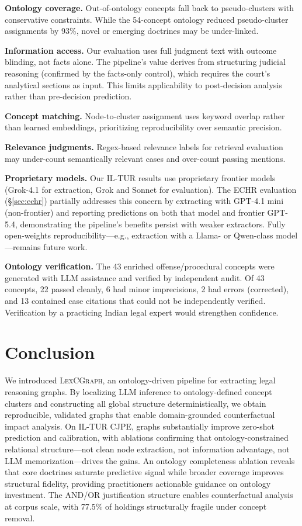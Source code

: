 \documentclass[11pt]{article}
\begin{document}
\textbf{Ontology coverage.} Out-of-ontology concepts fall back to pseudo-clusters with conservative constraints. While the 54-concept ontology reduced pseudo-cluster assignments by 93\%, novel or emerging doctrines may be under-linked.

\textbf{Information access.} Our evaluation uses full judgment text with outcome blinding, not facts alone. The pipeline's value derives from structuring judicial reasoning (confirmed by the facts-only control), which requires the court's analytical sections as input. This limits applicability to post-decision analysis rather than pre-decision prediction.

\textbf{Concept matching.} Node-to-cluster assignment uses keyword overlap rather than learned embeddings, prioritizing reproducibility over semantic precision.

\textbf{Relevance judgments.} Regex-based relevance labels for retrieval evaluation may under-count semantically relevant cases and over-count passing mentions.

\textbf{Proprietary models.} Our IL-TUR results use proprietary frontier models (Grok-4.1 for extraction, Grok and Sonnet for evaluation). The ECHR evaluation (\S\ref{sec:echr}) partially addresses this concern by extracting with GPT-4.1 mini (non-frontier) and reporting predictions on both that model and frontier GPT-5.4, demonstrating the pipeline's benefits persist with weaker extractors. Fully open-weights reproducibility---e.g., extraction with a Llama- or Qwen-class model---remains future work.

\textbf{Ontology verification.} The 43 enriched offense/procedural concepts were generated with LLM assistance and verified by independent audit. Of 43 concepts, 22 passed cleanly, 6 had minor imprecisions, 2 had errors (corrected), and 13 contained case citations that could not be independently verified. Verification by a practicing Indian legal expert would strengthen confidence.

\section{Conclusion}

We introduced \textsc{LexCGraph}, an ontology-driven pipeline for extracting legal reasoning graphs. By localizing LLM inference to ontology-defined concept clusters and constructing all global structure deterministically, we obtain reproducible, validated graphs that enable domain-grounded counterfactual impact analysis. On IL-TUR CJPE, graphs substantially improve zero-shot prediction and calibration, with ablations confirming that ontology-constrained relational structure---not clean node extraction, not information advantage, not LLM memorization---drives the gains. An ontology completeness ablation reveals that core doctrines saturate predictive signal while broader coverage improves structural fidelity, providing practitioners actionable guidance on ontology investment. The AND/OR justification structure enables counterfactual analysis at corpus scale, with 77.5\% of holdings structurally fragile under concept removal.
\end{document}
